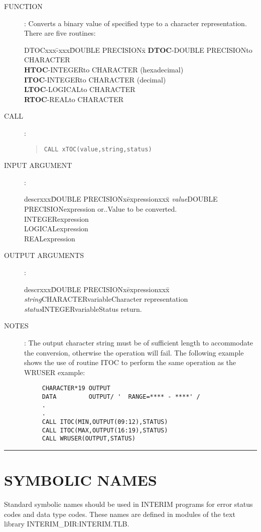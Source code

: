 \begin{description}
\item [FUNCTION]:
Converts a binary value of specified type to a character representation.
There are five routines:
\begin{center}
\begin{tabbing}
DTOCxxx\=-xxx\=DOUBLE PRECISIONx\=\kill
{\bf DTOC}\>-\>DOUBLE PRECISION\>to CHARACTER\\
{\bf HTOC}\>-\>INTEGER\>to CHARACTER (hexadecimal)\\
{\bf ITOC}\>-\>INTEGER\>to CHARACTER (decimal)\\
{\bf LTOC}\>-\>LOGICAL\>to CHARACTER\\
{\bf RTOC}\>-\>REAL\>to CHARACTER
\end{tabbing}
\end{center}
\item [CALL]:
\begin{quote}
{\tt CALL xTOC(value,string,status)}
\end{quote}
\item [INPUT ARGUMENT]:
\begin{tabbing}
descrxxx\=DOUBLE PRECISIONx\=expressionxxx\=\kill
{\em value}\>DOUBLE PRECISION\>expression or..\>Value to be converted.\\
\>INTEGER\>expression\\
\>LOGICAL\>expression\\
\>REAL\>expression
\end{tabbing}
\item [OUTPUT ARGUMENTS]:
\begin{tabbing}
descrxxx\=DOUBLE PRECISIONx\=expressionxxx\=\kill
{\em string}\>CHARACTER\>variable\>Character representation\\
{\em status}\>INTEGER\>variable\>Status return.
\end{tabbing}
\item [NOTES]:
The output character string must be of sufficient length to accommodate
the conversion, otherwise the operation will fail.
The following example shows the use of routine ITOC to perform the same
operation as the WRUSER example:
\begin{verbatim}
     CHARACTER*19 OUTPUT
     DATA         OUTPUT/ '  RANGE=**** - ****' /
     .
     .
     CALL ITOC(MIN,OUTPUT(09:12),STATUS)
     CALL ITOC(MAX,OUTPUT(16:19),STATUS)
     CALL WRUSER(OUTPUT,STATUS)
\end{verbatim}
\end{description}
\rule{\textwidth}{0.3mm}
\section {SYMBOLIC NAMES}
Standard symbolic names should be used in INTERIM programs for error status
codes and data type codes.
These names are defined in modules of the text library INTERIM\_DIR:INTERIM.TLB.
